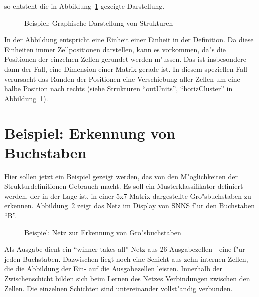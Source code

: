so entsteht die in Abbildung~\ref{TopologieBild} gezeigte Darstellung.

\begin{figure}[htb]
  \begin{center}
    \fbox{
      \begin{minipage}{\textwidth}
        \begin{center}
	   
	\end{center}
      \end{minipage}
    }
    \caption{\label{TopologieBild} Beispiel: Graphische Darstellung von Strukturen}
  \end{center}
\end{figure}

In der Abbildung entspricht eine Einheit einer Einheit in der
Definition. Da diese Einheiten immer Zellpositionen darstellen, kann
es vorkommen, da"s die Positionen der einzelnen Zellen gerundet werden
m"ussen. Das ist insbesondere dann der Fall, eine Dimension einer
Matrix gerade ist. In diesem speziellen Fall verursacht das Runden der
Positionen eine Verschiebung aller
Zellen um eine halbe Position nach rechts (siehe Strukturen
``outUnits'', ``horizCluster'' in Abbildung~\ref{TopologieBild}).


\section{Beispiel: Erkennung von Buchstaben}

Hier sollen jetzt ein Beispiel gezeigt werden, das von den
M"oglichkeiten der Strukturdefinitionen Gebrauch macht. Es soll ein
Musterklassifikator definiert werden, der in der Lage ist, in einer
5x7-Matrix dargestellte Gro"sbuchstaben zu erkennen.
Abbildung~\ref{LetterNetBild} zeigt das Netz im Display von SNNS f"ur
den Buchstaben ``B''.

\begin{figure}[htbp]
  \begin{center}
      \begin{minipage}{\textwidth}
      \end{minipage}
    \caption{\label{LetterNetBild} Beispiel: Netz zur Erkennung von Gro"sbuchstaben}
  \end{center}
\end{figure}

Als Ausgabe dient ein ``winner-takes-all'' Netz aus 26 Ausgabezellen -
eine f"ur jeden Buchstaben.  Dazwischen liegt noch eine Schicht aus
zehn internen Zellen, die die Abbildung der Ein- auf die Ausgabezellen
leisten. Innerhalb der Zwischenschicht bilden sich beim Lernen des
Netzes Verbindungen zwischen den Zellen. Die einzelnen Schichten sind
untereinander vollst"andig verbunden.

